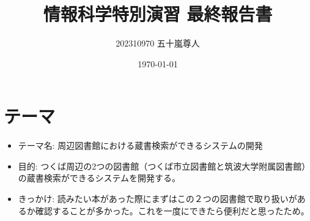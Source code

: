 \documentclass[a4paper,11pt]{jsarticle}
\begin{document}
\title{情報科学特別演習 最終報告書}
\author{202310970 五十嵐尊人}
\date{\today}
\maketitle
\section{テーマ}
\begin{itemize}
  \item テーマ名: 周辺図書館における蔵書検索ができるシステムの開発
  \item 目的: つくば周辺の2つの図書館（つくば市立図書館と筑波大学附属図書館）の蔵書検索ができるシステムを開発する。
  \item きっかけ: 読みたい本があった際にまずはこの２つの図書館で取り扱いがあるか確認することが多かった。これを一度にできたら便利だと思ったため。
\end{itemize}
\end{document}

